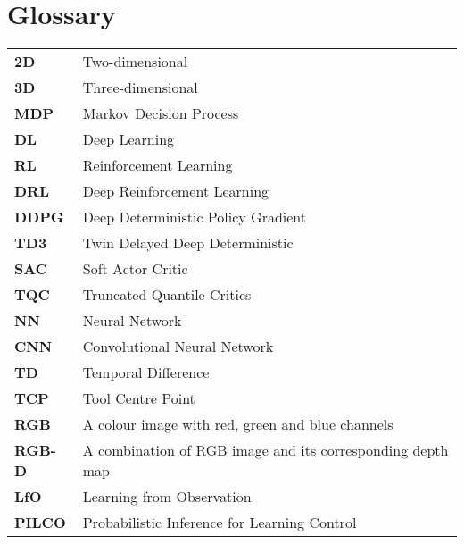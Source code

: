 %
\chapter*{Glossary}

\capstartfalse
\begin{table}[!hb]
    \begin{tabular}{ll}
        \textbf{2D}    & Two-dimensional                                            \\
        \textbf{3D}    & Three-dimensional                                          \\
        \textbf{MDP}   & Markov Decision Process                                    \\
        \textbf{DL}    & Deep Learning                                              \\
        \textbf{RL}    & Reinforcement Learning                                     \\
        \textbf{DRL}   & Deep Reinforcement Learning                                \\
        \textbf{DDPG}  & Deep Deterministic Policy Gradient                         \\
        \textbf{TD3}   & Twin Delayed Deep Deterministic                            \\
        \textbf{SAC}   & Soft Actor Critic                                          \\
        \textbf{TQC}   & Truncated Quantile Critics                                 \\
        \textbf{NN}    & Neural Network                                             \\
        \textbf{CNN}   & Convolutional Neural Network                               \\
        \textbf{TD}    & Temporal Difference                                        \\
        \textbf{TCP}   & Tool Centre Point                                          \\
        \textbf{RGB}   & A colour image with red, green and blue channels           \\
        \textbf{RGB-D} & A combination of RGB image and its corresponding depth map \\
        \textbf{LfO}   & Learning from Observation                                  \\
        \textbf{PILCO} & Probabilistic Inference for Learning Control               \\

\end{tabular}
\end{table}
